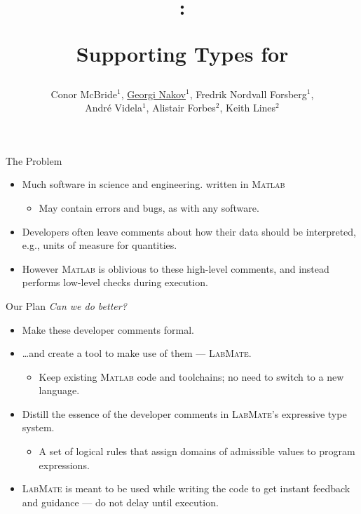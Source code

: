 \documentclass[]{beamer}
\title{\huge \lm: \\ \centerline{Supporting Types for \ma} }
\author[McBride, Nakov, Nordvall Forsberg et al]{\small Conor McBride$^{1}$, \underline{Georgi Nakov}$^{1}$, Fredrik Nordvall Forsberg$^{1}$,\\ Andr\'e Videla$^{1}$, Alistair Forbes$^{2}$, Keith Lines$^{2}$}
\institute[]{$^{1}$University of Strathclyde, UK\\$^{2}$National Physical Laboratory, UK}
\newcommand{\lm}{\textsc{LabMate}\xspace}
\newcommand{\ma}{\textsc{Matlab}\xspace}
\begin{document}
\begin{frame}
  \titlepage
\end{frame}

\begin{frame}{The Problem}
  \begin{itemize}
  \item Much software in science and engineering.
    written in \ma
    \smallskip
    \begin{itemize}
    \item May contain errors and bugs, as with any software.
    \end{itemize}
    \bigskip
  \item Developers often leave comments about how their data should be
    interpreted, e.g., units of measure for quantities.
    \bigskip
  \item However \ma is oblivious to these high-level comments, and
    instead performs low-level %
    checks during execution.
  \end{itemize}
\end{frame}

\begin{frame}{Our Plan}
  \textit{Can we do better?}
  
  \begin{itemize}
    \medskip
  \item Make these developer comments formal.
    \medskip
  \item \ldots and create a tool to make use of them --- \lm.
    \begin{itemize}
      \smallskip
    \item Keep existing \ma code and toolchains; no need to
      switch to a new language.
    \end{itemize}
    \medskip
  \item Distill the essence of the developer comments in
    \lm's expressive type system.
    \begin{itemize}
      \smallskip
    \item A set of logical rules that assign domains of admissible
      values to program expressions.
    \end{itemize}
    \medskip
  \item \lm is meant to be used while writing the code to get instant
    feedback and guidance --- do not delay until execution.
  \end{itemize}
\end{frame}
\end{document}
